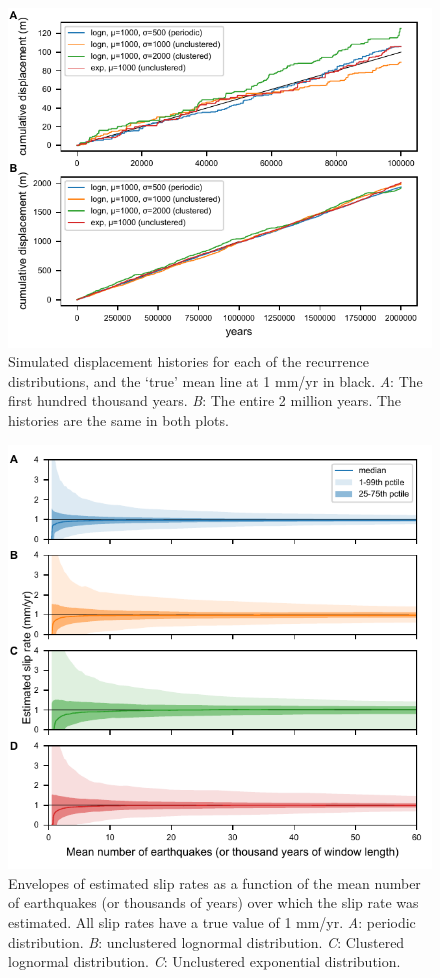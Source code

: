 \documentclass[se, manuscript]{copernicus}
\begin{document}
\begin{figure}[t]
  \includegraphics[width=12cm]{./figures/disp_histories.pdf}
  \caption{Simulated displacement histories for each of the recurrence 
  distributions, and the `true' mean line at 1 mm/yr in black. \emph{A}: The 
  first hundred thousand years. \emph{B}: The entire 2 million years. The 
  histories are the same in both plots. \label{disp_histories}}
\end{figure}


\clearpage


\begin{figure}[t]
  \includegraphics[width=12cm]{./figures/slip_rate_envelopes.pdf}
  \caption{Envelopes of estimated slip rates as a function of the mean number 
  of earthquakes (or thousands of years) over which the slip rate was 
  estimated. All slip rates have a true value of 1 mm/yr. \emph{A}: periodic 
  distribution. \emph{B}: unclustered lognormal distribution. \emph{C}: 
  Clustered lognormal distribution. \emph{C}: Unclustered exponential 
  distribution. \label{slip_rate_envelopes}}
\end{figure}
\end{document}
